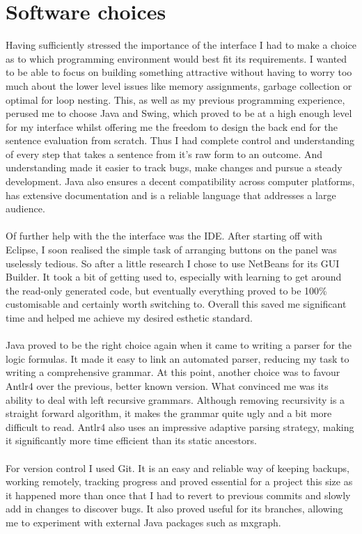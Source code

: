 \documentclass{report}
\begin{document}
\section{Software choices}
Having sufficiently stressed the importance of the interface I had to make a choice as to which programming environment would best fit its requirements. I wanted to be able to focus on building something attractive without having to worry too much about the lower level issues like memory assignments, garbage collection or optimal for loop nesting. This, as well as my previous programming experience, perused me to choose Java and Swing, which proved to be at a high enough level for my interface whilst offering me the freedom to design the back end for the sentence evaluation from scratch. Thus I had complete control and understanding of every step that takes a sentence from it's raw form to an outcome. And understanding made it easier to track bugs, make changes and pursue a steady development. Java also ensures a decent compatibility across computer platforms, has extensive documentation and is a reliable language that addresses a large audience. \\ \\
Of further help with the the interface was the IDE. After starting off with Eclipse, I soon realised the simple task of arranging buttons on the panel was uselessly tedious. So after a little research I chose to use NetBeans for its GUI Builder. It took a bit of getting used to, especially with learning to get around the read-only generated code, but eventually everything proved to be 100\% customisable and certainly worth switching to. Overall this saved me significant time and helped me achieve my desired esthetic standard. \\ \\
Java proved to be the right choice again when it came to writing a parser for the logic formulas. It made it easy to link an automated parser, reducing my task to writing a comprehensive grammar. At this point, another choice was to favour Antlr4 over the previous, better known version. What convinced me was its ability to deal with left recursive grammars. Although removing recursivity is a straight forward algorithm, it makes the grammar quite ugly and a bit more difficult to read. Antlr4 also uses an impressive adaptive parsing strategy, making it significantly more time efficient than its static ancestors.\\ \\
For version control I used Git. It is an easy and reliable way of keeping backups, working remotely, tracking progress and proved essential for a project this size as it happened more than once that I had to revert to previous commits and slowly add in changes to discover bugs. It also proved useful for its branches, allowing me to experiment with external Java packages such as mxgraph.\\ \\
\end{document}
